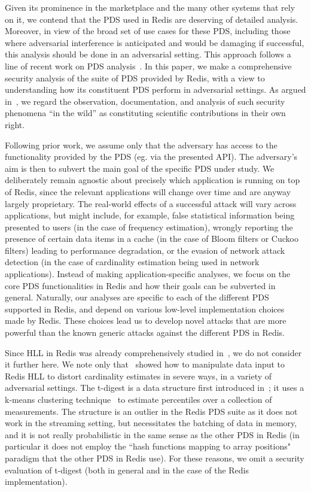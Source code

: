 Given its prominence in the marketplace and the many other systems that rely on it, we contend that the PDS used in Redis are deserving of detailed analysis. Moreover, in view of the broad set of use cases for these PDS, including those where adversarial interference is anticipated and would be damaging if successful, this analysis should be done in an adversarial setting. This approach follows a line of recent work on PDS analysis~\cite{GerbetKL15,clayton2019,cardestprivacy,hllvuln,PatersonR22,markelon23}. In this paper, we make a comprehensive security analysis of the suite of PDS provided by Redis, with a view to understanding how its constituent PDS perform in adversarial settings. As argued in~\cite{cryptoeprint:2024/532}, we regard the observation, documentation, and analysis of such security phenomena ``in the wild'' as constituting scientific contributions in their own right.

Following prior work, we assume only that the adversary has access to the functionality provided by the PDS (eg. via the presented API). The adversary's aim is then to subvert the main goal of the specific PDS under study. 
We deliberately remain agnostic about precisely which application is running on top of Redis, since the relevant applications will change over time and are anyway largely proprietary. The real-world effects of a successful attack will vary across applications, but might include, for example, false statistical information being presented to users (in the case of frequency estimation), wrongly reporting the presence of certain data items in a cache (in the case of Bloom filters or Cuckoo filters) leading to performance degradation, or the evasion of network attack detection (in the case of cardinality estimation being used in network applications). 
Instead of making application-specific analyses, we focus on the core PDS functionalities in Redis and how their goals can be subverted in general. Naturally, our analyses are specific to each of the different PDS supported in Redis, and depend on various low-level implementation choices made by Redis. These choices lead us to develop novel attacks that are more powerful than the known generic attacks against the different PDS in Redis.

Since HLL in Redis was already comprehensively studied in~\cite{PatersonR22}, we do not consider it further here. We note only that~\cite{PatersonR22} showed how to manipulate data input to Redis HLL to distort cardinality estimates in severe ways, in a variety of adversarial settings. The t-digest is a data structure first introduced in~\cite{dunning2021t}; it uses a k-means clustering technique~\cite{kodinariya2013review} to estimate percentiles over a collection of measurements. The structure is an outlier in the Redis PDS suite as it does not work in the streaming setting, but necessitates the batching of data in memory, and it is not really probabilistic in the same sense as the other PDS in Redis (in particular it does not employ the ``hash functions mapping to array positions" paradigm that the other PDS in Redis use). For these reasons, we omit a security evaluation of t-digest (both in general and in the case of the Redis implementation).

